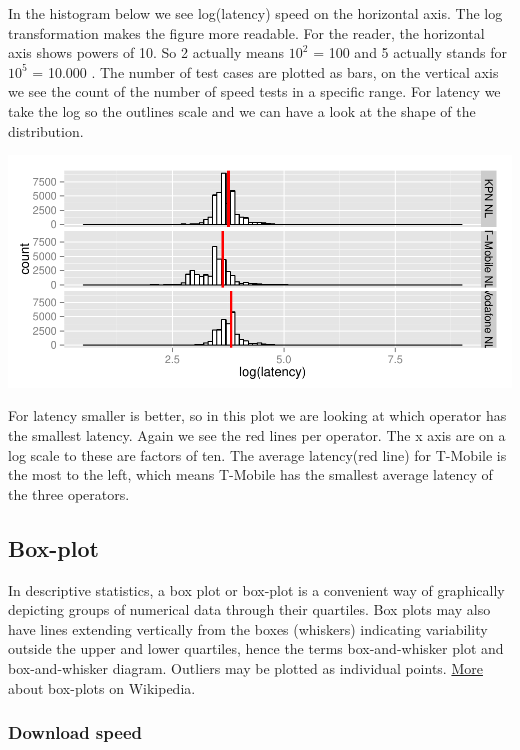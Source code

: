 \documentclass[]{article}
\begin{document}
In the histogram below we see log(latency) speed on the horizontal axis.
The log transformation makes the figure more readable. For the reader,
the horizontal axis shows powers of 10. So 2 actually means \(10^{2}\) =
100 and 5 actually stands for \(10^{5}\) = 10.000 . The number of test
cases are plotted as bars, on the vertical axis we see the count of the
number of speed tests in a specific range. For latency we take the log
so the outlines scale and we can have a look at the shape of the
distribution.

\includegraphics{speedtest-analysis_files/figure-latex/latency-1.pdf}

For latency smaller is better, so in this plot we are looking at which
operator has the smallest latency. Again we see the red lines per
operator. The x axis are on a log scale to these are factors of ten. The
average latency(red line) for T-Mobile is the most to the left, which
means T-Mobile has the smallest average latency of the three operators.

\subsection{Box-plot}\label{box-plot}

In descriptive statistics, a box plot or box-plot is a convenient way of
graphically depicting groups of numerical data through their quartiles.
Box plots may also have lines extending vertically from the boxes
(whiskers) indicating variability outside the upper and lower quartiles,
hence the terms box-and-whisker plot and box-and-whisker diagram.
Outliers may be plotted as individual points.
\href{https://en.wikipedia.org/wiki/Box_plot}{More} about box-plots on
Wikipedia.

\subsubsection{Download speed}\label{download-speed-1}
\end{document}
